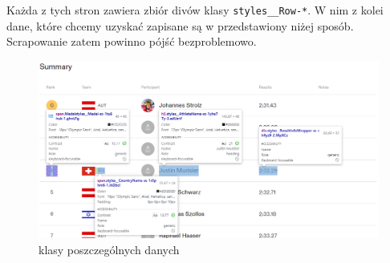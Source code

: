 \documentclass[a4paper,11pt]{article}
\begin{document}
Każda z tych stron zawiera zbiór divów klasy \verb|styles__Row-*|. W nim z kolei
dane, które chcemy uzyskać zapisane są w przedstawiony niżej sposób. Scrapowanie
zatem powinno pójść bezproblemowo.
\begin{figure}[ht]
    \centering
    \includegraphics[width=0.8\linewidth]{data-classes.png}
    \caption{klasy poszczególnych danych}
\end{figure}
\end{document}
